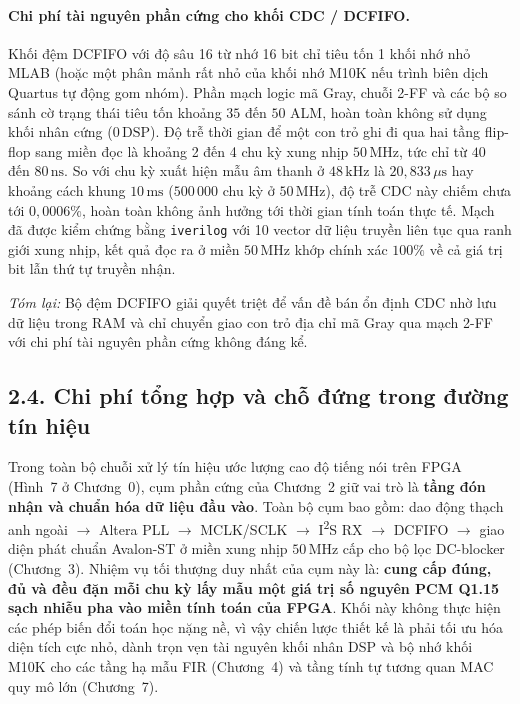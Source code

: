 \paragraph{Chi phí tài nguyên phần cứng cho khối CDC / DCFIFO.}
Khối đệm DCFIFO với độ sâu 16 từ nhớ 16 bit chỉ tiêu tốn 1 khối nhớ nhỏ MLAB (hoặc một phân mảnh rất nhỏ của khối nhớ M10K nếu trình biên dịch Quartus tự động gom nhóm). Phần mạch logic mã Gray, chuỗi 2-FF và các bộ so sánh cờ trạng thái tiêu tốn khoảng $35$ đến $50$ ALM, hoàn toàn không sử dụng khối nhân cứng ($0\,\text{DSP}$). Độ trễ thời gian để một con trỏ ghi đi qua hai tầng flip-flop sang miền đọc là khoảng 2 đến 4 chu kỳ xung nhịp $50\,\text{MHz}$, tức chỉ từ $40$ đến $80\,\text{ns}$. So với chu kỳ xuất hiện mẫu âm thanh ở $48\,\text{kHz}$ là $20{,}833\,\mu\mathrm{s}$ hay khoảng cách khung $10\,\text{ms}$ ($500\,000$ chu kỳ ở $50\,\text{MHz}$), độ trễ CDC này chiếm chưa tới $0{,}0006\%$, hoàn toàn không ảnh hưởng tới thời gian tính toán thực tế. Mạch đã được kiểm chứng bằng \texttt{iverilog} với 10 vector dữ liệu truyền liên tục qua ranh giới xung nhịp, kết quả đọc ra ở miền $50\,\text{MHz}$ khớp chính xác $100\%$ về cả giá trị bit lẫn thứ tự truyền nhận.

\textit{Tóm lại:} Bộ đệm DCFIFO giải quyết triệt để vấn đề bán ổn định CDC nhờ lưu dữ liệu trong RAM và chỉ chuyển giao con trỏ địa chỉ mã Gray qua mạch 2-FF với chi phí tài nguyên phần cứng không đáng kể.

\subsection*{2.4. Chi phí tổng hợp và chỗ đứng trong đường tín hiệu}

Trong toàn bộ chuỗi xử lý tín hiệu ước lượng cao độ tiếng nói trên FPGA (Hình~7 ở Chương~0), cụm phần cứng của Chương~2 giữ vai trò là \textbf{tầng đón nhận và chuẩn hóa dữ liệu đầu vào}. Toàn bộ cụm bao gồm: dao động thạch anh ngoài $\to$ Altera PLL $\to$ MCLK/SCLK $\to$ I\textsuperscript{2}S RX $\to$ DCFIFO $\to$ giao diện phát chuẩn Avalon-ST ở miền xung nhịp $50\,\text{MHz}$ cấp cho bộ lọc DC-blocker (Chương~3). Nhiệm vụ tối thượng duy nhất của cụm này là: \textbf{cung cấp đúng, đủ và đều đặn mỗi chu kỳ lấy mẫu một giá trị số nguyên PCM Q1.15 sạch nhiễu pha vào miền tính toán của FPGA}. Khối này không thực hiện các phép biến đổi toán học nặng nề, vì vậy chiến lược thiết kế là phải tối ưu hóa diện tích cực nhỏ, dành trọn vẹn tài nguyên khối nhân DSP và bộ nhớ khối M10K cho các tầng hạ mẫu FIR (Chương~4) và tầng tính tự tương quan MAC quy mô lớn (Chương~7).

